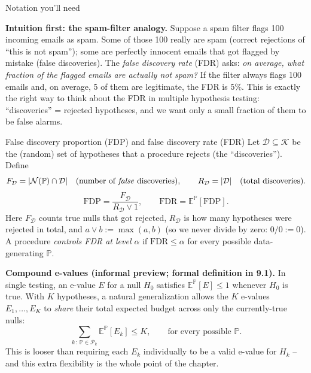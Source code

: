 \documentclass[aspectratio=169,10pt]{beamer}
\newcommand{\Kc}{\mathcal{K}}
\newcommand{\Nc}{\mathcal{N}}
\begin{document}
\begin{frame}[allowframebreaks]{Notation you'll need}

\textbf{Intuition first: the spam-filter analogy.} Suppose a spam filter flags 100 incoming emails as spam. Some of those 100 really are spam (correct rejections of ``this is not spam''); some are perfectly innocent emails that got flagged by mistake (false discoveries). The \emph{false discovery rate} (FDR) asks: \emph{on average, what fraction of the flagged emails are actually not spam?} If the filter always flags 100 emails and, on average, 5 of them are legitimate, the FDR is $5\%$. This is exactly the right way to think about the FDR in multiple hypothesis testing: ``discoveries'' = rejected hypotheses, and we want only a small fraction of them to be false alarms.

\begin{block}{False discovery proportion (FDP) and false discovery rate (FDR)}
Let $\mathcal{D} \subseteq \Kc$ be the (random) set of hypotheses that a procedure rejects (the ``discoveries''). Define
\[
F_{\mathcal{D}} = |\Nc(\mathbb{P}) \cap \mathcal{D}| \quad (\text{number of \emph{false} discoveries}), \qquad R_{\mathcal{D}} = |\mathcal{D}| \quad (\text{total discoveries}).
\]
\[
\text{FDP} = \frac{F_{\mathcal{D}}}{R_{\mathcal{D}} \vee 1}, \qquad \text{FDR} = \mathbb{E}^{\mathbb{P}}[\text{FDP}].
\]
Here $F_\mathcal{D}$ counts true nulls that got rejected, $R_\mathcal{D}$ is how many hypotheses were rejected in total, and $a \vee b := \max(a,b)$ (so we never divide by zero: $0/0:=0$). A procedure \emph{controls FDR at level $\alpha$} if $\text{FDR} \le \alpha$ for every possible data-generating $\mathbb{P}$.
\end{block}

\framebreak

\textbf{Compound e-values (informal preview; formal definition in 9.1).} In single testing, an e-value $E$ for a null $H_0$ satisfies $\mathbb{E}^{\mathbb{P}}[E] \le 1$ whenever $H_0$ is true. With $K$ hypotheses, a natural generalization allows the $K$ e-values $E_1,\dots,E_K$ to \emph{share} their total expected budget across only the currently-true nulls:
\[
\sum_{k \,:\, \mathbb{P} \in \mathcal{P}_k} \mathbb{E}^{\mathbb{P}}[E_k] \le K, \qquad \text{for every possible } \mathbb{P}.
\]
This is looser than requiring each $E_k$ individually to be a valid e-value for $H_k$ -- and this extra flexibility is the whole point of the chapter.


\end{frame}
\end{document}
